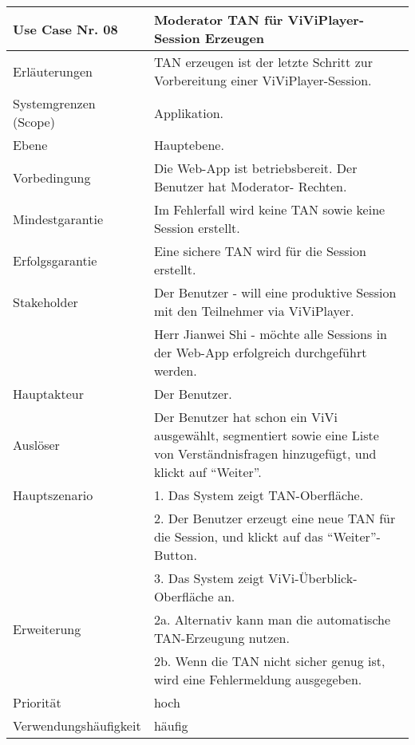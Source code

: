 \begin{tabularx}{\linewidth}{|l|X|}
	\hline
	Use Case Nr. 08			& \textbf{Moderator TAN für ViViPlayer-Session Erzeugen} \\ \hline
	Erläuterungen			& TAN erzeugen ist der letzte Schritt zur Vorbereitung einer 
							  ViViPlayer-Session. \\ \hline
	Systemgrenzen (Scope)	& Applikation. \\ \hline
	Ebene					& Hauptebene. \\ \hline
	Vorbedingung			& Die Web-App ist betriebsbereit. Der Benutzer hat Moderator-
							  Rechten. \\ \hline
	Mindestgarantie			& Im Fehlerfall wird keine TAN sowie keine Session erstellt.
							  \\ \hline
	Erfolgsgarantie			& Eine sichere TAN wird für die Session erstellt. \\ \hline
	Stakeholder				& Der Benutzer - will eine produktive Session mit den Teilnehmer 
							  via ViViPlayer. \\
							& Herr Jianwei Shi - möchte alle Sessions in der Web-App 
							  erfolgreich durchgeführt werden. \\ \hline
	Hauptakteur				& Der Benutzer. \\ \hline
	Auslöser				& Der Benutzer hat schon ein ViVi ausgewählt, segmentiert sowie 
							  eine Liste von Verständnisfragen hinzugefügt, und klickt auf 
							  ``Weiter''. \\ \hline	
	Hauptszenario			& 1. Das System zeigt TAN-Oberfläche. \\
							& 2. Der Benutzer erzeugt eine neue TAN für die Session, und klickt auf das 
							  ``Weiter''-Button. \\ 
							& 3. Das System zeigt ViVi-Überblick-Oberfläche an. \\ \hline
	Erweiterung				& 2a. Alternativ kann man die automatische TAN-Erzeugung nutzen. 
							  \\
							& 2b. Wenn die TAN nicht sicher genug ist, wird eine Fehlermeldung ausgegeben. 
							  \\ \hline
	Priorität				& hoch \\ \hline
	Verwendungshäufigkeit	& häufig \\ \hline
\end{tabularx}